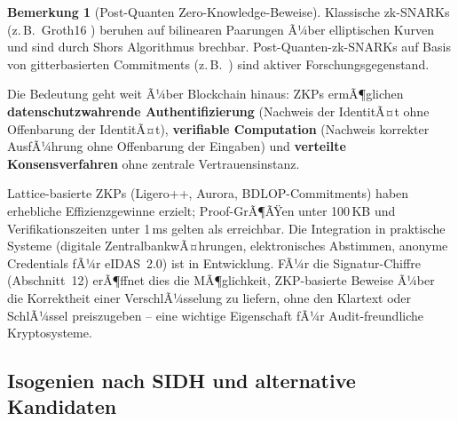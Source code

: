 ﻿\documentclass[a4paper,12pt]{article}
\theoremstyle{definition}
\newtheorem{bemerkung}{Bemerkung}[section]
\begin{document}
\begin{bemerkung}[Post-Quanten Zero-Knowledge-Beweise]
Klassische zk-SNARKs (z.\,B.\ Groth16 \cite{Gro16}) beruhen auf
bilinearen Paarungen Ã¼ber elliptischen Kurven und sind durch
Shors Algorithmus brechbar. Post-Quanten-zk-SNARKs auf Basis
von gitterbasierten Commitments (z.\,B.\ \cite{BFRS23}) sind
aktiver Forschungsgegenstand.

Die Bedeutung geht weit Ã¼ber Blockchain hinaus:
ZKPs ermÃ¶glichen \textbf{datenschutzwahrende Authentifizierung}
(Nachweis der IdentitÃ¤t ohne Offenbarung der IdentitÃ¤t),
\textbf{verifiable Computation} (Nachweis korrekter AusfÃ¼hrung
ohne Offenbarung der Eingaben) und
\textbf{verteilte Konsensverfahren} ohne zentrale Vertrauensinstanz.

Lattice-basierte ZKPs (Ligero++, Aurora, BDLOP-Commitments)
haben erhebliche Effizienzgewinne erzielt; Proof-GrÃ¶ÃŸen unter
100\,KB und Verifikationszeiten unter 1\,ms gelten als erreichbar.
Die Integration in praktische Systeme (digitale ZentralbankwÃ¤hrungen,
elektronisches Abstimmen, anonyme Credentials fÃ¼r eIDAS~2.0) ist
in Entwicklung. FÃ¼r die Signatur-Chiffre (Abschnitt~12) erÃ¶ffnet
dies die MÃ¶glichkeit, ZKP-basierte Beweise Ã¼ber die Korrektheit
einer VerschlÃ¼sselung zu liefern, ohne den Klartext oder SchlÃ¼ssel
preiszugeben -- eine wichtige Eigenschaft fÃ¼r Audit-freundliche
Kryptosysteme.
\end{bemerkung}

\subsection{Isogenien nach SIDH und alternative Kandidaten}
\end{document}

